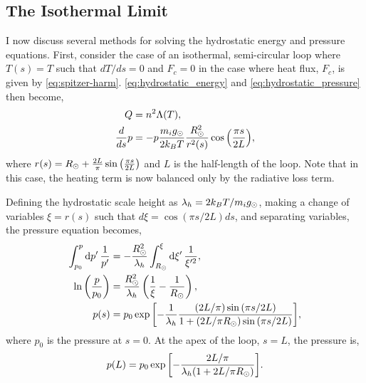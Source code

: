 \subsection{The Isothermal Limit}\label{sec:isothermal}

I now discuss several methods for solving the hydrostatic energy and pressure equations. First, consider the case of an isothermal, semi-circular loop where $T(s)=T$ such that $dT/ds=0$ and $F_c=0$ in the case where heat flux, $F_c$, is given by \autoref{eq:spitzer-harm}. \autoref{eq:hydrostatic_energy} and \autoref{eq:hydrostatic_pressure} then become,
\begin{align}
Q &= n^2\Lambda(T), \\
\frac{d}{ds}p &= -p\frac{m_ig_\odot}{2k_BT}\frac{R_\odot^2}{r^2(s)}\cos{\left(\frac{\pi s}{2L}\right)},
\end{align}
where $r(s) = R_\odot + \frac{2L}{\pi}\sin{\left(\frac{\pi s}{2L}\right)}$ and $L$ is the half-length of the loop. Note that in this case, the heating term is now balanced only by the radiative loss term. 

Defining the hydrostatic scale height as $\lambda_h=2k_BT/m_ig_\odot$, making a change of variables $\xi=r(s)$ such that $d\xi=\cos{(\pi s / 2L)}ds$, and separating variables, the pressure equation becomes,
\begin{align}
    \int_{p_0}^p\textup{d}p^\prime\,\frac{1}{p^\prime} &= -\frac{R_\odot^2}{\lambda_h}\int_{R_\odot}^\xi\textup{d}\xi^\prime\,\frac{1}{\xi^{\prime2}},\nonumber \\
    \ln\left(\frac{p}{p_0}\right) &= \frac{R_\odot^2}{\lambda_h}\left(\frac{1}{\xi} - \frac{1}{R_\odot}\right),\nonumber \\
    p(s) &= p_0\exp{\left[-\frac{1}{\lambda_h}\frac{(2L/\pi)\sin{(\pi s/2L)}}{1 + (2L/\pi R_\odot)\sin{(\pi s/2L)}}\right]}, \label{eq:isothermal_pressure}
\end{align}
where $p_0$ is the pressure at $s=0$. At the apex of the loop, $s=L$, the pressure is,
\begin{equation*}
    p(L) = p_0\exp{\left[-\frac{2L/\pi}{\lambda_h(1 + 2L/\pi R_\odot)}\right]}.
\end{equation*}

